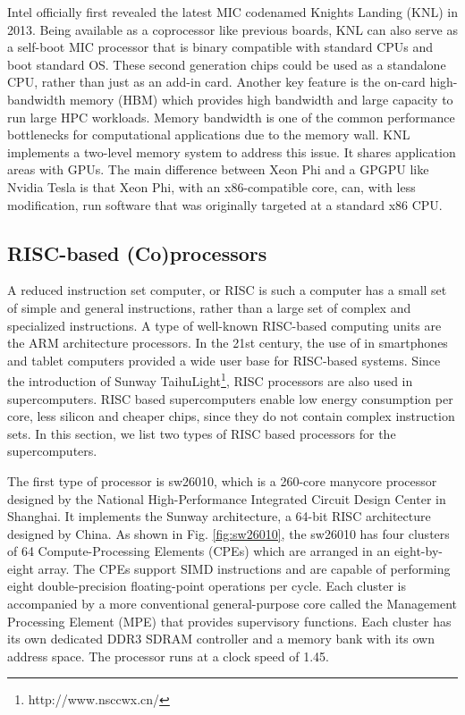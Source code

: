 Intel officially first revealed the latest MIC codenamed Knights Landing (KNL) in 2013. Being available as a coprocessor like previous boards, KNL can also serve as a self-boot MIC processor that is binary compatible with standard CPUs and boot
standard OS. These second generation chips could be used as a standalone CPU, rather than just as an add-in card. Another key feature is the on-card high-bandwidth memory (HBM) which provides high bandwidth and large capacity to run large HPC workloads. Memory bandwidth is one of the common performance bottlenecks for computational applications due to the memory wall. KNL implements a two-level memory system to address this issue. It shares application areas with GPUs. The main difference between Xeon Phi and a GPGPU like Nvidia Tesla is that Xeon Phi, with an x86-compatible core, can, with less modification, run software that was originally targeted at a standard x86 CPU.

\subsection{RISC-based (Co)processors}

A reduced instruction set computer, or RISC  is such a computer has a small set of simple and general instructions, rather than a large set of complex and specialized instructions. A type of well-known RISC-based computing units are the ARM architecture processors. In the 21st century, the use of in smartphones and tablet computers provided a wide user base for RISC-based systems. Since the introduction of Sunway TaihuLight\footnote{http://www.nsccwx.cn/}, RISC processors are also used in supercomputers. RISC based supercomputers enable low energy consumption per core, less silicon and cheaper chips, since they do not contain complex instruction sets. In this section, we list two types of RISC based processors for the supercomputers.

The first type of processor is sw26010, which is a 260-core manycore processor \cite{fu2016sunway} designed by the National High-Performance Integrated Circuit Design Center in Shanghai. It implements the Sunway architecture, a 64-bit RISC architecture designed by China. As shown in Fig. \ref{fig:sw26010}, the sw26010 has four clusters of 64 Compute-Processing Elements (CPEs) which are arranged in an eight-by-eight array. The CPEs support SIMD instructions and are capable of performing eight double-precision floating-point operations per cycle. Each cluster is accompanied by a more conventional general-purpose core called the Management Processing Element (MPE) that provides supervisory functions. Each cluster has its own dedicated DDR3 SDRAM controller and a memory bank with its own address space. The processor runs at a clock speed of 1.45.


